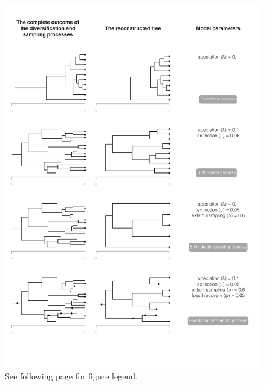 \documentclass[11pt]{article}
\begin{document}
\clearpage


\begin{figure}
\centering
\includegraphics[width=\textwidth]{figures/birth-death-trees-v2.pdf}
\caption{\footnotesize See following page for figure legend.
}
\label{fig:birth-death}
\end{figure}

\clearpage
\end{document}
